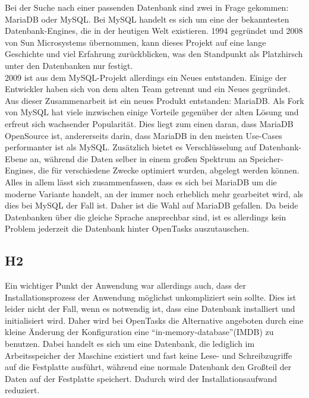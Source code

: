 Bei der Suche nach einer passenden Datenbank sind zwei in Frage gekommen: MariaDB oder MySQL. Bei MySQL handelt es sich um eine der bekanntesten Datenbank-Engines, die in der heutigen Welt existieren. 1994 gegründet und 2008 von Sun Microsystems übernommen, kann dieses Projekt auf eine lange Geschichte und viel Erfahrung zurückblicken, was den Standpunkt als Platzhirsch unter den Datenbanken nur festigt. \\
2009 ist aus dem MySQL-Projekt allerdings ein Neues entstanden. Einige der Entwickler haben sich von dem alten Team getrennt und ein Neues gegründet. Aus dieser Zusammenarbeit ist ein neues Produkt entstanden: MariaDB. Als Fork von MySQL hat viele inzwischen einige Vorteile gegenüber der alten Lösung und erfreut sich wachsender Popularität. Dies liegt zum einen daran, dass MariaDB OpenSource ist, andererseits darin, dass MariaDB in den meisten Use-Cases performanter ist als MySQL. Zusätzlich bietet es Verschlüsselung auf Datenbank-Ebene an, während die Daten selber in einem großen Spektrum an Speicher-Engines, die für verschiedene Zwecke optimiert wurden, abgelegt werden können. \\

Alles in allem lässt sich zusammenfassen, dass es sich bei MariaDB um die moderne Variante handelt, an der immer noch erheblich mehr gearbeitet wird, als dies bei MySQL der Fall ist. Daher ist die Wahl auf MariaDB gefallen. Da beide Datenbanken über die gleiche Sprache ansprechbar sind, ist es allerdings kein Problem jederzeit die Datenbank hinter OpenTasks auszutauschen.

\subsection{H2}

Ein wichtiger Punkt der Anwendung war allerdings auch, dass der Installationsprozess der Anwendung möglichst unkompliziert sein sollte. Dies ist leider nicht der Fall, wenn es notwendig ist, dass eine Datenbank installiert und initialisiert wird. Daher wird bei OpenTasks die Alternative angeboten durch eine kleine Änderung der Konfiguration eine ``in-memory-database''(IMDB) zu benutzen. Dabei handelt es sich um eine Datenbank, die lediglich im Arbeitsspeicher der Maschine existiert und fast keine Lese- und Schreibzugriffe auf die Festplatte ausführt, während eine normale Datenbank den Großteil der Daten auf der Festplatte speichert. Dadurch wird der Installationsaufwand reduziert. \\

